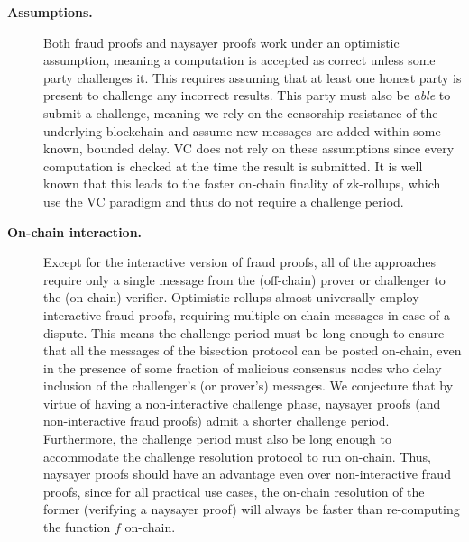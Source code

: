 \begin{description}
   \item[\textbf{Assumptions.}]
   Both fraud proofs and naysayer proofs work under an optimistic assumption, meaning a computation is accepted as correct unless some party challenges it. This requires assuming that at least one honest party is present to challenge any incorrect results. This party must also be \emph{able} to submit a challenge, meaning we rely on the censorship-resistance of the underlying blockchain and assume new messages are added within some known, bounded delay. VC does not rely on these assumptions since every computation is checked at the time the result is submitted. It is well known that this leads to the faster on-chain finality of zk-rollups, which use the VC paradigm and thus do not require a challenge period.
   
   \item[\textbf{On-chain interaction.}]
   Except for the interactive version of fraud proofs, all of the approaches require only a single message from the (off-chain) prover or challenger to the (on-chain) verifier. Optimistic rollups almost universally employ interactive fraud proofs, requiring multiple on-chain messages in case of a dispute. This means the challenge period must be long enough to ensure that all the messages of the bisection protocol can be posted on-chain, even in the presence of some fraction of malicious consensus nodes who delay inclusion of the challenger's (or prover's) messages. We conjecture that by virtue of having a non-interactive challenge phase, naysayer proofs (and non-interactive fraud proofs) admit a shorter challenge period. Furthermore, the challenge period must also be long enough to accommodate the challenge resolution protocol to run on-chain. Thus, naysayer proofs should have an advantage even over non-interactive fraud proofs, since for all practical use cases, the on-chain resolution of the former (verifying a naysayer proof) will always be faster than re-computing the function $f$ on-chain.
    

\end{description}
